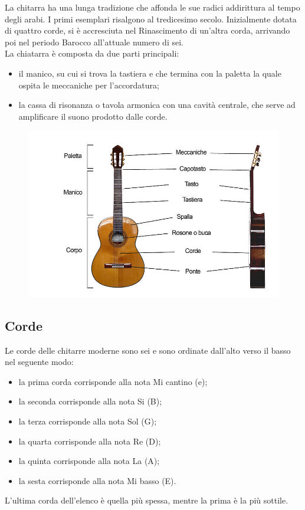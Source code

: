 La chitarra ha una lunga tradizione che affonda le sue radici addirittura al tempo degli arabi. I primi esemplari risalgono al tredicesimo secolo. Inizialmente dotata di quattro corde, si è accresciuta nel Rinascimento di un'altra corda, arrivando poi nel periodo Barocco all'attuale numero di sei.\\
\newline
La chiatarra è composta da due parti principali:
\begin{itemize}
	\item il manico, su cui si trova la tastiera e che termina con la paletta la quale ospita le meccaniche per l'accordatura;
	\item la cassa di risonanza o tavola armonica con una cavità centrale, che serve ad amplificare il suono prodotto dalle corde.
\end{itemize}

\begin{figure}[H]
	\centering
	\includegraphics[scale=0.50]{./images/img14.jpg}
\end{figure}

\subsection{Corde}
Le corde delle chitarre moderne sono sei e sono ordinate dall'alto verso il basso nel seguente modo:
\begin{itemize}
	\item la prima corda corrisponde alla nota Mi cantino (e);
	\item la seconda corrisponde alla nota Si (B);
	\item la terza corrisponde alla nota Sol (G);
	\item la quarta corrisponde alla nota Re (D);
	\item la quinta corrisponde alla nota La (A);
	\item la sesta corrisponde alla nota Mi basso (E).
\end{itemize}
L'ultima corda dell'elenco è quella più spessa, mentre la prima è la più sottile.
